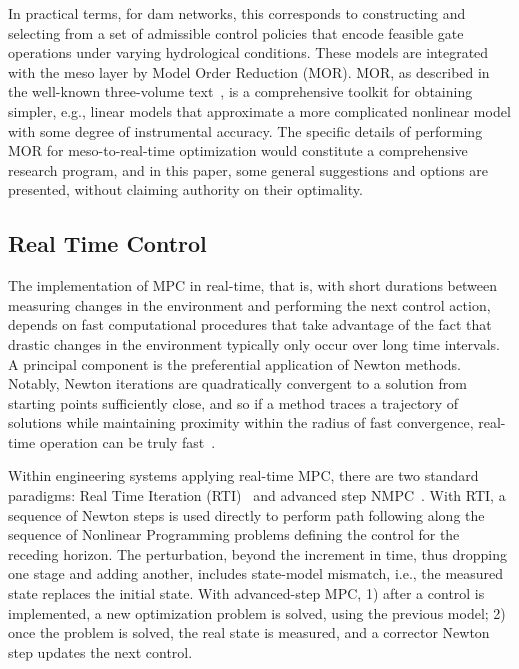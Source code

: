 \documentclass{article}
\newcommand{\1}{\mathds{1}}          %
\theoremstyle{definition}
\begin{document}
\begin{sloppypar}
In practical terms, for dam networks, this corresponds to constructing and selecting from a set of admissible control policies that encode feasible gate operations under varying hydrological conditions. These models are integrated with the meso layer by Model Order Reduction (MOR). MOR, as described in the well-known three-volume text~\cite{benner2017model}, is a comprehensive toolkit for obtaining simpler, e.g., linear models that approximate a more complicated nonlinear model with some degree of instrumental accuracy. The specific details of performing MOR for meso-to-real-time optimization would constitute a comprehensive research program, and in this paper, some general suggestions and options are presented, without claiming authority on their optimality.


\subsection{Real Time Control}

The implementation of MPC in real-time, that is, with short durations between measuring changes in the environment and performing the next control action, depends on fast computational procedures that take advantage of the fact that drastic changes in the environment typically only occur over long time intervals. A principal component is the preferential application of Newton methods. Notably, Newton iterations are quadratically convergent to a solution from starting points sufficiently close, and so if a method traces a trajectory of solutions while maintaining proximity within the radius of fast convergence, real-time operation can be truly fast~\cite{deuflhard2011newton}.

Within engineering systems applying real-time MPC, there are two standard paradigms: Real Time Iteration (RTI)~\cite{diehl2005real} and advanced step NMPC~\cite{huang2009advanced}. With RTI, a sequence of Newton steps is used directly to perform path following along the sequence of Nonlinear Programming problems defining the control for the receding horizon. The perturbation, beyond the increment in time, thus dropping one stage and adding another, includes state-model mismatch, i.e., the measured state replaces the initial state. With advanced-step MPC, 1) after a control is implemented, a new optimization problem is solved, using the previous model; 2) once the problem is solved, the real state is measured, and a corrector Newton step updates the next control. 


\end{sloppypar}
\end{document}
